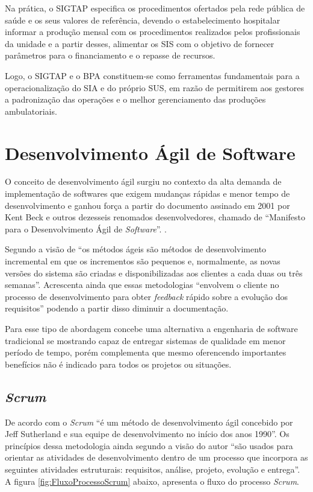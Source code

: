 Na prática, o SIGTAP especifica os procedimentos ofertados pela rede pública de saúde e os seus valores de referência, devendo o estabelecimento hospitalar informar a produção mensal com os procedimentos realizados pelos profissionais da unidade e a partir desses, alimentar os SIS com o objetivo de fornecer parâmetros para o financiamento e o repasse de recursos.

Logo, o SIGTAP e o BPA constituem-se como ferramentas fundamentais para a operacionalização do SIA e do próprio SUS, em razão de permitirem aos gestores a padronização das operações e o melhor gerenciamento das produções ambulatoriais.

\section{Desenvolvimento Ágil de Software}
O conceito de desenvolvimento ágil surgiu no contexto da alta demanda de implementação de softwares que exigem mudanças rápidas e menor tempo de desenvolvimento e ganhou força a partir do documento assinado em 2001 por Kent Beck e outros dezesseis renomados desenvolvedores, chamado de ``Manifesto para o Desenvolvimento Ágil de \textit{Software}''. \cite{pressman2011engenharia}.

Segundo a visão de  ``os métodos ágeis são métodos de desenvolvimento incremental em que os incrementos são pequenos e, normalmente, as novas versões do sistema são criadas e disponibilizadas aos clientes a cada duas ou três semanas''.  Acrescenta ainda que essas metodologias ``envolvem o cliente no processo de desenvolvimento para obter \textit{feedback} rápido sobre a evolução dos requisitos'' podendo a partir disso diminuir a documentação.

Para  esse tipo de abordagem concebe uma alternativa a engenharia de software tradicional se mostrando capaz de entregar sistemas de qualidade em menor período de tempo, porém complementa que mesmo oferencendo importantes benefícios não é indicado para todos os projetos ou situações.

\subsection{\textit{Scrum}}
De acordo com  o \textit{Scrum} ``é um método de desenvolvimento ágil concebido por Jeff Sutherland e sua equipe de desenvolvimento no início dos anos 1990''. Os princípios dessa metodologia ainda segundo a visão do autor ``são usados para orientar
as atividades de desenvolvimento dentro de um processo que incorpora as seguintes atividades
estruturais: requisitos, análise, projeto, evolução e entrega''. A figura \ref{fig:FluxoProcessoScrum} abaixo, apresenta o fluxo do processo \textit{Scrum}.

